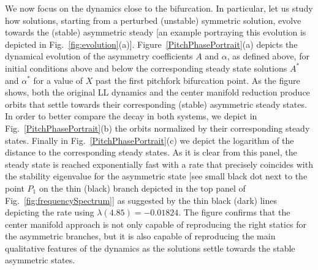 We now focus on the dynamics close to the bifurcation.
In particular, let us study how solutions, starting from
a perturbed (unstable) symmetric solution, evolve towards the
(stable) asymmetric steady [an example portraying this evolution
is depicted in Fig.~\ref{fig:evolution}(a)].
%
Figure~\ref{PitchPhasePortrait}(a) depicts the dynamical evolution
of the asymmetry coefficients $A$ and $\alpha$, as defined above,
for initial conditions above and below the corresponding
steady state solutions $A^*$ and $\alpha^*$ for a value
of $X$ past the first pitchfork bifurcation point.
%
As the figure shows, both the original LL dynamics and the
center manifold reduction produce orbits that settle towards
their corresponding (stable) asymmetric steady states.
%
In order to better compare the decay in both systems,
we depict in Fig.~\ref{PitchPhasePortrait}(b) the orbits
normalized by their corresponding steady states.
%
Finally in Fig.~\ref{PitchPhasePortrait}(c) we depict the
logarithm of the distance to the corresponding steady states.
As it is clear from this panel, the steady state is reached
exponentially fast with a rate that precisely coincides with
the stability eigenvalue for the asymmetric state
[see small black dot next to the point $P_1$ on the thin (black) branch 
depicted in the top panel of Fig.~\ref{fig:frequencySpectrum}]
as suggested by the thin black (dark) lines depicting the
rate using $\lambda(4.85)=-0.01824$.
%
The figure confirms that the center manifold approach is not only
capable of reproducing the right statics for the asymmetric
branches, but it is also capable of reproducing the main qualitative
features of the dynamics
as the solutions settle towards the stable asymmetric states.
%

